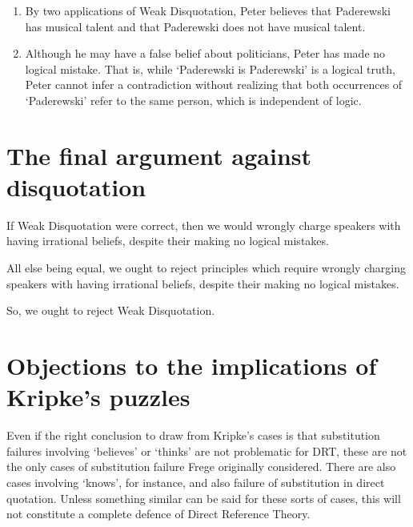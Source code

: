 \begin{enumerate}[label=\roman*.]
  \item By two applications of Weak Disquotation, Peter believes that Paderewski has musical talent and that Paderewski does not have musical talent.
  \item Although he may have a false belief about politicians, Peter has made no logical mistake. That is, while `Paderewski is Paderewski' is a logical truth, Peter cannot infer a contradiction without realizing that both occurrences of `Paderewski' refer to the same person, which is independent of logic.
\end{enumerate}

\section{The final argument against disquotation}

\begin{argument}\leavevmode
\begin{premises}
  \item[(P1)] If Weak Disquotation were correct, then we would wrongly charge speakers with having irrational beliefs, despite their making no logical mistakes.
  \item[(P2)] All else being equal, we ought to reject principles which require wrongly charging speakers with having irrational beliefs, despite their making no logical mistakes.
  \item[(C)] So, we ought to reject Weak Disquotation.
\end{premises}
\end{argument}

\section{Objections to the implications of Kripke's puzzles}

\begin{objection}
Even if the right conclusion to draw from Kripke's cases is that substitution failures involving `believes' or `thinks' are not problematic for DRT, these are not the only cases of substitution failure Frege originally considered. There are also cases involving `knows', for instance, and also failure of substitution in direct quotation. Unless something similar can be said for these sorts of cases, this will not constitute a complete defence of Direct Reference Theory.
\end{objection}

